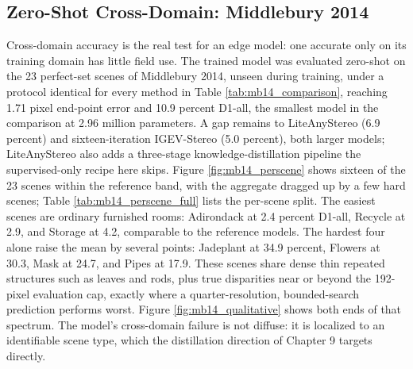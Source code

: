 \subsection{Zero-Shot Cross-Domain: Middlebury 2014}
Cross-domain accuracy is the real test for an edge model: one accurate
only on its training domain has little field use. The trained model was
evaluated zero-shot on the 23 perfect-set scenes of Middlebury 2014,
unseen during training, under a protocol identical for every method in
Table \ref{tab:mb14_comparison}, reaching 1.71 pixel end-point error and
10.9 percent D1-all, the smallest model in the comparison at 2.96 million
parameters. A gap remains to LiteAnyStereo (6.9 percent) and
sixteen-iteration IGEV-Stereo (5.0 percent), both larger models;
LiteAnyStereo also adds a three-stage knowledge-distillation pipeline the
supervised-only recipe here skips. Figure \ref{fig:mb14_perscene} shows
sixteen of the 23 scenes within the reference band, with the aggregate
dragged up by a few hard scenes; Table \ref{tab:mb14_perscene_full} lists
the per-scene split. The easiest
scenes are ordinary furnished rooms: Adirondack at 2.4 percent D1-all,
Recycle at 2.9, and Storage at 4.2, comparable to the reference models.
The hardest four alone raise the mean by several points: Jadeplant at
34.9 percent, Flowers at 30.3, Mask at 24.7, and Pipes at 17.9. These
scenes share dense thin repeated structures such as leaves and rods,
plus true disparities near or beyond the 192-pixel evaluation cap,
exactly where a quarter-resolution, bounded-search prediction performs
worst. Figure \ref{fig:mb14_qualitative} shows both ends of that
spectrum. The model's cross-domain failure is not diffuse: it is
localized to an identifiable scene type, which the distillation
direction of Chapter 9 targets directly.

\begin{table}[!htbp]
\centering
\caption{\textbf{Zero-shot Middlebury 2014 comparison.} 23 perfect-set scenes, $384\times 640$ inference, identical protocol across all rows (disparity ground truth scaled to the inference width, values above 192 px masked). Reference rows from the repository's matched-protocol evaluations of the public checkpoints \cite{jing2025liteanystereo,xu2023igev}. Latency is the per-scene median on a cloud T4 in fp32 eager mode.}
\label{tab:mb14_comparison}
\small
{}
\end{table}

